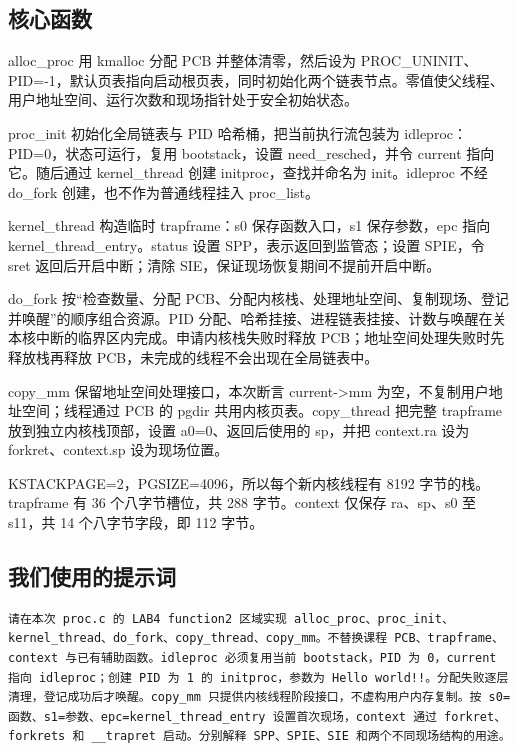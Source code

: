 \documentclass[UTF8,a4paper,10pt]{ctexart}
\begin{document}
\subsection{核心函数}

alloc\_proc 用 kmalloc 分配 PCB 并整体清零，然后设为 PROC\_UNINIT、PID=-1，默认页表指向启动根页表，同时初始化两个链表节点。零值使父线程、用户地址空间、运行次数和现场指针处于安全初始状态。


proc\_init 初始化全局链表与 PID 哈希桶，把当前执行流包装为 idleproc：PID=0，状态可运行，复用 bootstack，设置 need\_resched，并令 current 指向它。随后通过 kernel\_thread 创建 initproc，查找并命名为 init。idleproc 不经 do\_fork 创建，也不作为普通线程挂入 proc\_list。


kernel\_thread 构造临时 trapframe：s0 保存函数入口，s1 保存参数，epc 指向 kernel\_thread\_entry。status 设置 SPP，表示返回到监管态；设置 SPIE，令 sret 返回后开启中断；清除 SIE，保证现场恢复期间不提前开启中断。


do\_fork 按“检查数量、分配 PCB、分配内核栈、处理地址空间、复制现场、登记并唤醒”的顺序组合资源。PID 分配、哈希挂接、进程链表挂接、计数与唤醒在关本核中断的临界区内完成。申请内核栈失败时释放 PCB；地址空间处理失败时先释放栈再释放 PCB，未完成的线程不会出现在全局链表中。


copy\_mm 保留地址空间处理接口，本次断言 current->mm 为空，不复制用户地址空间；线程通过 PCB 的 pgdir 共用内核页表。copy\_thread 把完整 trapframe 放到独立内核栈顶部，设置 a0=0、返回后使用的 sp，并把 context.ra 设为 forkret、context.sp 设为现场位置。


KSTACKPAGE=2，PGSIZE=4096，所以每个新内核线程有 8192 字节的栈。trapframe 有 36 个八字节槽位，共 288 字节。context 仅保存 ra、sp、s0 至 s11，共 14 个八字节字段，即 112 字节。


\subsection{我们使用的提示词}

\begin{lstlisting}
请在本次 proc.c 的 LAB4 function2 区域实现 alloc_proc、proc_init、kernel_thread、do_fork、copy_thread、copy_mm。不替换课程 PCB、trapframe、context 与已有辅助函数。idleproc 必须复用当前 bootstack，PID 为 0，current 指向 idleproc；创建 PID 为 1 的 initproc，参数为 Hello world!!。分配失败逐层清理，登记成功后才唤醒。copy_mm 只提供内核线程阶段接口，不虚构用户内存复制。按 s0=函数、s1=参数、epc=kernel_thread_entry 设置首次现场，context 通过 forkret、forkrets 和 __trapret 启动。分别解释 SPP、SPIE、SIE 和两个不同现场结构的用途。
\end{lstlisting}
\end{document}
